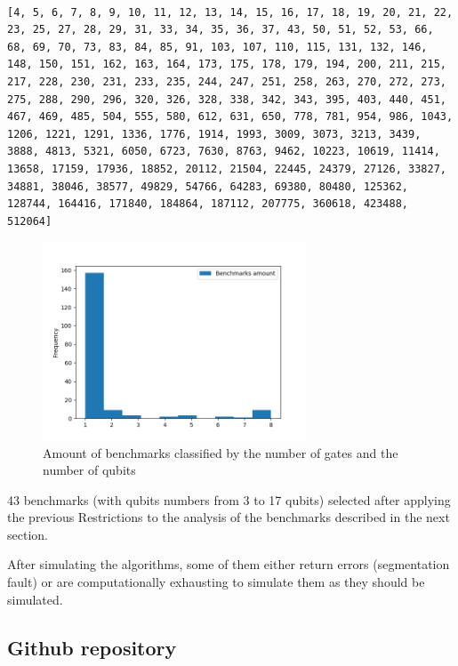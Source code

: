 \begin{verbatim}

[4, 5, 6, 7, 8, 9, 10, 11, 12, 13, 14, 15, 16, 17, 18, 19, 20, 21, 22, 23, 25, 27, 28, 29, 31, 33, 34, 35, 36, 37, 43, 50, 51, 52, 53, 66, 68, 69, 70, 73, 83, 84, 85, 91, 103, 107, 110, 115, 131, 132, 146, 148, 150, 151, 162, 163, 164, 173, 175, 178, 179, 194, 200, 211, 215, 217, 228, 230, 231, 233, 235, 244, 247, 251, 258, 263, 270, 272, 273, 275, 288, 290, 296, 320, 326, 328, 338, 342, 343, 395, 403, 440, 451, 467, 469, 485, 504, 555, 580, 612, 631, 650, 778, 781, 954, 986, 1043, 1206, 1221, 1291, 1336, 1776, 1914, 1993, 3009, 3073, 3213, 3439, 3888, 4813, 5321, 6050, 6723, 7630, 8763, 9462, 10223, 10619, 11414, 13658, 17159, 17936, 18852, 20112, 21504, 22445, 24379, 27126, 33827, 34881, 38046, 38577, 49829, 54766, 64283, 69380, 80480, 125362, 128744, 164416, 171840, 184864, 187112, 207775, 360618, 423488, 512064]

\end{verbatim}
\begin{figure}[htbp]
\centering
\includegraphics[width=0.7\textwidth]{figures/number_of_benchmarks_depending_on_the_number_of_qubits_and_gates.png}
\caption{\label{fig:org5ed015b}
Amount of benchmarks classified by the number of gates and the number of qubits}
\end{figure}
43 benchmarks (with qubits numbers from 3 to 17 qubits) selected after applying the previous Restrictions to the analysis of the benchmarks described in the next section.

After simulating the algorithms, some of them either return errors (segmentation fault) or are computationally exhausting to simulate them as they should be simulated.



\subsection*{Github repository}
\label{sec:org7e37c15}

